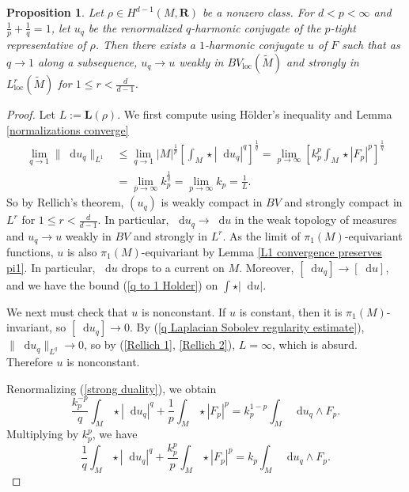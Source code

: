 \documentclass[reqno,11pt]{amsart}
\newcommand{\RR}{\mathbf{R}}
\newcommand*\dif{\mathop{}\!\mathrm{d}}
\newcommand{\Comass}{\mathbf L}
\newcommand{\loc}{\mathrm{loc}}
\newtheorem{proposition}[theorem]{Proposition}
\theoremstyle{definition}
\numberwithin{equation}{section}
\begin{document}
\begin{proposition}\label{existence 1}
Let $\rho \in H^{d - 1}(M, \RR)$ be a nonzero class.
For $d < p < \infty$ and $\frac{1}{p} + \frac{1}{q} = 1$, let $u_q$ be the renormalized $q$-harmonic conjugate of the $p$-tight representative of $\rho$.
Then there exists a $1$-harmonic conjugate $u$ of $F$ such that as $q \to 1$ along a subsequence, $u_q \to u$ weakly in $BV_\loc(\tilde M)$ and strongly in $L^r_\loc(\tilde M)$ for $1 \leq r < \frac{d}{d - 1}$.
\end{proposition}
\begin{proof}
Let $L := \Comass(\rho)$.
We first compute using H\"older's inequality and Lemma \ref{normalizations converge}
\begin{align}
\lim_{q \to 1} \|\dif u_q\|_{L^1}
&\leq \lim_{q \to 1} |M|^{\frac{1}{p}} \left[\int_M \star |\dif u_q|^q\right]^{\frac{1}{q}} = \lim_{p \to \infty} \left[k_p^p \int_M \star |F_p|^p\right]^{\frac{1}{q}} \label{Rellich 1}\\
&= \lim_{p \to \infty} k_p^{\frac{1}{q}} = \lim_{p \to \infty} k_p = \frac{1}{L} \label{Rellich 2}.
\end{align}
So by Rellich's theorem, $(u_q)$ is weakly compact in $BV$ and strongly compact in $L^r$ for $1 \leq r < \frac{d}{d - 1}$.
In particular, $\dif u_q \to \dif u$ in the weak topology of measures and $u_q \to u$ weakly in $BV$ and strongly in $L^r$.
As the limit of $\pi_1(M)$-equivariant functions, $u$ is also $\pi_1(M)$-equivariant by Lemma \ref{L1 convergence preserves pi1}.
In particular, $\dif u$ drops to a current on $M$.
Moreover, $[\dif u_q] \to [\dif u]$, and we have the bound (\ref{q to 1 Holder}) on $\int \star |\dif u|$.

We next must check that $u$ is nonconstant.
If $u$ is constant, then it is $\pi_1(M)$-invariant, so $[\dif u_q] \to 0$.
By (\ref{q Laplacian Sobolev regularity estimate}), $\|\dif u_q\|_{L^q} \to 0$, so by (\ref{Rellich 1}, \ref{Rellich 2}), $L = \infty$, which is absurd.
Therefore $u$ is nonconstant.

Renormalizing (\ref{strong duality}), we obtain 
$$\frac{k_p^{-p}}{q} \int_M \star |\dif u_q|^q + \frac{1}{p} \int_M \star |F_p|^p = k_p^{1 - p} \int_M \dif u_q \wedge F_p.$$
Multiplying by $k_p^p$, we have 
\begin{equation}\label{1 strong duality before limits}
	\frac{1}{q} \int_M \star |\dif u_q|^q + \frac{k_p^p}{p} \int_M \star |F_p|^p = k_p \int_M \dif u_q \wedge F_p.
\end{equation}


\end{proof}
\end{document}
